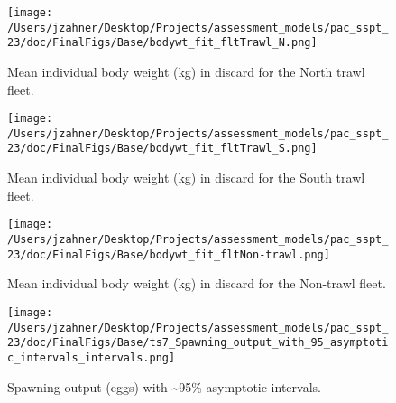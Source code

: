 \documentclass[11pt,
  letterpaper,
]{article}
\begin{document}
\begin{figure}
{\centering
\texttt{[image: /Users/jzahner/Desktop/Projects/assessment\_models/pac\_sspt\_23/doc/FinalFigs/Base/bodywt\_fit\_fltTrawl\_N.png]}
}
\caption{Mean individual body weight (kg) in discard for the North trawl fleet.\label{fig:weightNorthTrl}}
\end{figure}

\begin{figure}
{\centering
\texttt{[image: /Users/jzahner/Desktop/Projects/assessment\_models/pac\_sspt\_23/doc/FinalFigs/Base/bodywt\_fit\_fltTrawl\_S.png]}
}
\caption{Mean individual body weight (kg) in discard for the South trawl fleet.\label{fig:weightSouthTrl}}
\end{figure}

\begin{figure}
{\centering
\texttt{[image: /Users/jzahner/Desktop/Projects/assessment\_models/pac\_sspt\_23/doc/FinalFigs/Base/bodywt\_fit\_fltNon-trawl.png]}
}
\caption{Mean individual body weight (kg) in discard for the Non-trawl fleet.\label{fig:weightNonTrl}}
\end{figure}

\begin{figure}
{\centering
\texttt{[image: /Users/jzahner/Desktop/Projects/assessment\_models/pac\_sspt\_23/doc/FinalFigs/Base/ts7\_Spawning\_output\_with\_95\_asymptotic\_intervals\_intervals.png]}
}
\caption{Spawning output (eggs) with \sim 95\% asymptotic intervals.\label{fig:spawnout}}
\end{figure}
\end{document}
